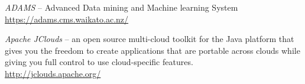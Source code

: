 %

\begin{thebibliography}{999}

		\textit{ADAMS} -- Advanced Data mining and Machine learning System \\
		\url{https://adams.cms.waikato.ac.nz/}{}
		
		\textit{Apache JClouds} -- an open source multi-cloud toolkit
		for the Java platform that gives you the freedom to create
		applications that are portable across clouds while giving you
		full control to use cloud-specific features. \\
		\url{http://jclouds.apache.org/}{}

\end{thebibliography}
